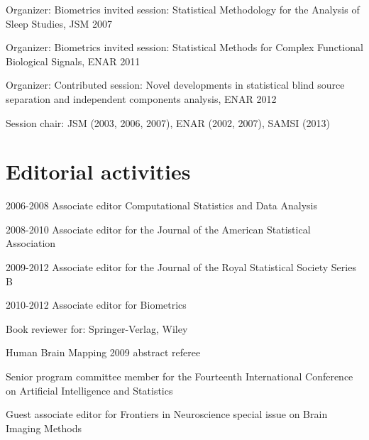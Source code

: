 \documentclass[12pt]{article}
\begin{document}
\begin{description}{}{}
\begin{description}
\item Organizer: Biometrics invited session: Statistical Methodology for the Analysis of Sleep Studies, JSM 2007 
\item Organizer: Biometrics invited session: Statistical Methods for Complex Functional Biological Signals, ENAR 2011
\item Organizer: Contributed session: Novel developments in statistical blind source separation and independent components analysis, ENAR 2012
\item Session chair: JSM (2003, 2006, 2007), ENAR (2002, 2007), SAMSI (2013) 
\end{description}
\end{description}

\section*{Editorial activities}
\begin{description}
\item 2006-2008 Associate editor Computational Statistics and Data Analysis
\item 2008-2010 Associate editor for the Journal of the American Statistical Association
\item 2009-2012 Associate editor for the Journal of the Royal Statistical Society
Series B
\item 2010-2012 Associate editor for Biometrics
\item Book reviewer for: Springer-Verlag, Wiley
\item Human Brain Mapping 2009 abstract referee
\item Senior program committee member for the Fourteenth International Conference on Artificial Intelligence and Statistics 
\item Guest associate editor for Frontiers in Neuroscience special issue
on Brain Imaging Methods
\end{description}
\end{document}
